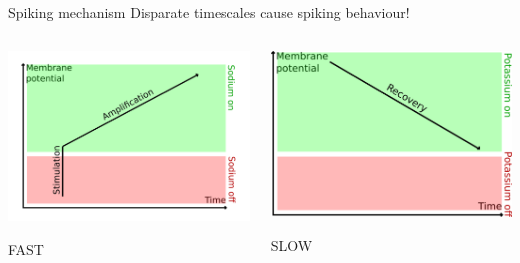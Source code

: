 \documentclass[presentation]{beamer}
\begin{document}
\begin{frame}[label={sec:org06bf165}]{Spiking mechanism}
Disparate timescales cause spiking behaviour!


\begin{columns}
\begin{column}{0.5\columnwidth}
\begin{center}
\includegraphics[width=.9\linewidth]{./fastsodium.png}
\end{center}

\begin{center}
FAST
\end{center}
\end{column}

\begin{column}{0.5\columnwidth}
\begin{center}
\includegraphics[width=.8\textwidth]{./slowpotassium.png}
\end{center}

\begin{center}
SLOW
\end{center}
\end{column}
\end{columns}
\end{frame}
\end{document}
